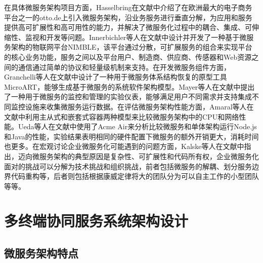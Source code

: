 在具体微服务架构项目方面，Hasselbring在文献\cite{hasselbring2017microservice}中介绍了在欧洲最大的电子商务平台之一的otto.de上引入微服务架构，沿业务服务进行垂直分解，为应用和服务提供高可扩展性和高可用性的能力，并解决了微服务化过程中的耦合、集成、可伸缩性、监视和开发等问题。Innerbichler等人在文献\cite{innerbichler2017nimble}中设计并开发了一种基于微服务架构的物联网平台NIMBLE，该平台通过分散，可扩展服务的组合来实现平台的核心业务功能，服务之间以及平台用户、制造商、供应商、传感器和Web资源之间的通信通过简单的协议和轻量级机制来支持。在开发微服务组件方面，Granchelli等人在文献\cite{granchelli2017microart}中设计了一种用于微服务体系结构恢复的原型工具MicroART，能够生成基于微服务的系统软件架构模型。Mayer等人在文献\cite{mayer2017dashboard}中提出了一种用于微服务的监控和管理的实验仪表，能够满足用户不同需求并支持集成不同监控设施来收集微服务运行数据。在评估微服务架构性能方面，Amaral等人在文献\cite{amaral2015performance}中利用主从式和嵌套式容器两种模型来比较微服务架构中的CPU和网络性能。Ueda等人在文献\cite{ueda2016workload}中使用了Acme Air来分析比较微服务和单体架构运行Node.js和Java的性能，实验结果表明相同的硬件配置下微服务的额外开销更大，消耗时间也更多。在宏观讨论企业微服务化可能遇到的问题方面，Kalske等人在文献\cite{kalske2017challenges}中指出，迈向微服务架构的典型原因是复杂性、可扩展性和代码所有权，企业微服务化面对的挑战可以分解为技术挑战和组织挑战，前者包括微服务的解耦、划分服务边界代码重构等，后者则包括根据康威定律将大的团队分为可以自主工作的小型团队等等。

\section{多终端协同服务系统架构设计}\label{sec:service_system_design}

\subsection{微服务架构特点}

